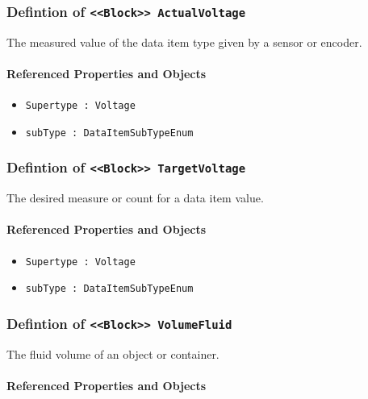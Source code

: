 \subsubsection{Defintion of \texttt{<<Block>> ActualVoltage}}
  \label{type:ActualVoltage}

\FloatBarrier

The measured value of the data item type given by a sensor or encoder.

\FloatBarrier
\paragraph{Referenced Properties and Objects}

\begin{itemize}
\item \texttt{Supertype : Voltage}

\item \texttt{subType : DataItemSubTypeEnum}

\end{itemize}
\FloatBarrier
\subsubsection{Defintion of \texttt{<<Block>> TargetVoltage}}
  \label{type:TargetVoltage}

\FloatBarrier

The desired measure or count for a data item value.

\FloatBarrier
\paragraph{Referenced Properties and Objects}

\begin{itemize}
\item \texttt{Supertype : Voltage}

\item \texttt{subType : DataItemSubTypeEnum}

\end{itemize}
\FloatBarrier
\subsubsection{Defintion of \texttt{<<Block>> VolumeFluid}}
  \label{type:VolumeFluid}

\FloatBarrier

The fluid volume of an object or container.

\FloatBarrier
\paragraph{Referenced Properties and Objects}

